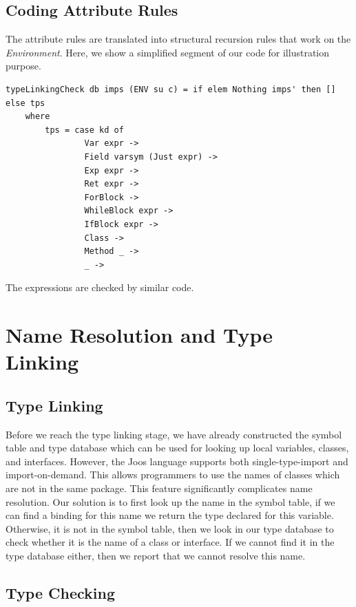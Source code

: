 \documentclass[12pt,letterpaper]{article}
\begin{document}
\subsection{Coding Attribute Rules}
The attribute rules are translated into structural recursion rules that work on the \emph{Environment}. Here, we show a simplified segment of our code for illustration purpose.
\begin{lstlisting}
typeLinkingCheck db imps (ENV su c) = if elem Nothing imps' then [] else tps
    where
        tps = case kd of
                Var expr ->
                Field varsym (Just expr) ->
                Exp expr ->
                Ret expr ->
                ForBlock ->
                WhileBlock expr ->
                IfBlock expr ->
                Class ->
                Method _ ->
                _ ->
\end{lstlisting}

The expressions are checked by similar code.

\section{Name Resolution and Type Linking}
\subsection{Type Linking}

Before we reach the type linking stage, we have already constructed the symbol table and type database which can be used for looking up local variables, classes, and interfaces.
However, the Joos language supports both single-type-import and import-on-demand.
This allows programmers to use the names of classes which are not in the same package.
This feature significantly complicates name resolution.
Our solution is to first look up the name in the symbol table, if we can find a binding for this name we return the type declared for this variable.
Otherwise, it is not in the symbol table, then we look in our type database to check whether it is the name of a class or interface.
If we cannot find it in the type database either, then we report that we cannot resolve this name.


\subsection{Type Checking}
\end{document}
